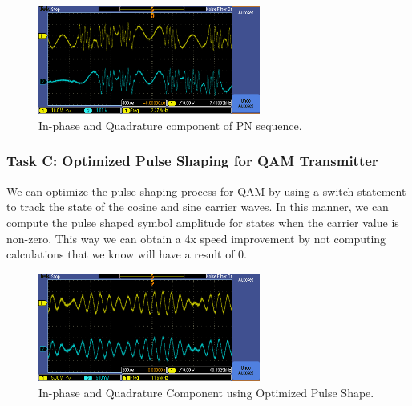 \documentclass{article}
\begin{document}
\pagebreak
\begin{figure}[h]
  \begin{center}
    \includegraphics[width=0.65\textwidth]{img/task_b_oscilloscope.png}
    \caption{In-phase and Quadrature component of PN sequence.}
  \end{center}
\end{figure}

\subsubsection{Task C: Optimized Pulse Shaping for QAM Transmitter}
We can optimize the pulse shaping process for QAM by using a switch statement to track the state of the cosine and sine carrier waves. In this manner, we can compute the pulse shaped symbol amplitude for states when the carrier value is non-zero. This way we can obtain a 4x speed improvement by not computing calculations that we know will have a result of 0.

\begin{figure}[h]
  \begin{center}
    \includegraphics[width=0.65\textwidth]{img/task_c_oscilloscope.png}
    \caption{In-phase and Quadrature Component using Optimized Pulse Shape.}
  \end{center}
\end{figure}
\end{document}
